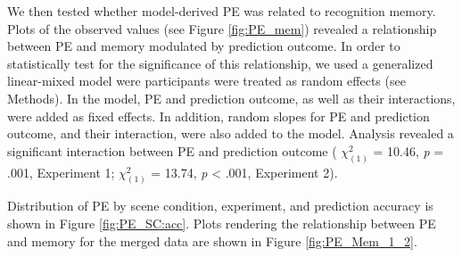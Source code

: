 \documentclass[a4paper,12pt]{article}
\begin{document}
\par
We then tested whether model-derived PE was related to recognition memory. Plots of the observed values (see Figure \ref{fig:PE_mem}) revealed a relationship between PE and memory modulated by prediction outcome. In order to statistically test for the significance of this relationship, we used a generalized linear-mixed model were participants were treated as random effects (see Methods). In the model, PE and prediction outcome, as well as their interactions, were added as fixed effects. In addition, random slopes for PE and prediction outcome, and their interaction, were also added to the model. Analysis revealed a significant interaction between PE and prediction outcome ( $\chi^2_{(1)}$ = 10.46, \textit{p} = .001, Experiment 1;  $\chi^2_{(1)}$ = 13.74, \textit{p} < .001, Experiment 2).

 Distribution of PE by scene condition, experiment, and prediction accuracy is shown in Figure \ref{fig:PE_SC:acc}. Plots rendering the relationship between PE and memory for the merged data are shown in Figure \ref{fig:PE_Mem_1_2}.
\end{document}
